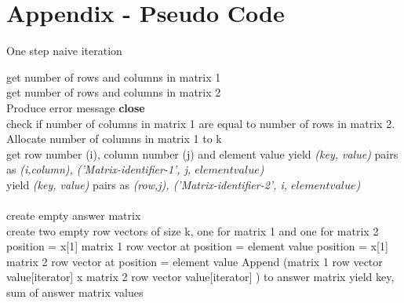 \documentclass[10pt,onecolumn]{article}
\begin{document}
\newpage
\section*{Appendix - Pseudo Code}
\makeatletter
\def\BState{\State\hskip-\ALG@thistlm}
\makeatother
\begin{algorithm}
\caption{One step naive iteration}\label{1step}
\begin{algorithmic}[1]
\State get number of rows and columns in matrix 1 \\
get number of rows and columns in matrix 2 \\
\State Produce error message
\State \textbf{close}
\EndIf \\
check if number of columns in matrix 1 are equal to number of rows in matrix 2.\\ Allocate number of columns in matrix 1 to k
 \\
\State get row number (i), column number (j) and element value
\State yield \textit{(key, value)} pairs as \textit{(i,column), ('Matrix-identifier-1', j, $element value$)} \\
\EndFor
\EndIf
{} 
\State yield \textit{(key, value)} pairs as \textit{(row,j), ('Matrix-identifier-2', i, $element value$)} \\
\EndFor
\EndIf
\EndProcedure
{} \\
create empty answer matrix \\
create two empty row vectors of size k, one for matrix 1 and one for matrix 2
\State position = x[1]
\State matrix 1 row vector at position = element value
\Else 
\State position = x[1]
\State matrix 2 row vector at position = element value
\EndIf
\EndFor
{}
\State Append (matrix 1 row vector value[iterator] x matrix 2 row vector value[iterator] ) to answer matrix
\EndFor
yield key, sum of answer matrix values
\EndProcedure
\end{algorithmic}
\end{algorithm}

\newpage
\end{document}
